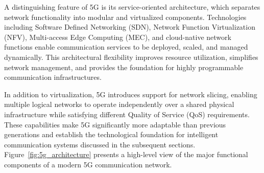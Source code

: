 \documentclass[12pt,a4paper]{report}
\begin{document}
	A distinguishing feature of 5G is its service-oriented architecture, which separates network functionality into modular and virtualized components. Technologies including Software Defined Networking (SDN), Network Function Virtualization (NFV), Multi-access Edge Computing (MEC), and cloud-native network functions enable communication services to be deployed, scaled, and managed dynamically. This architectural flexibility improves resource utilization, simplifies network management, and provides the foundation for highly programmable communication infrastructures.
	
	In addition to virtualization, 5G introduces support for network slicing, enabling multiple logical networks to operate independently over a shared physical infrastructure while satisfying different Quality of Service (QoS) requirements. These capabilities make 5G significantly more adaptable than previous generations and establish the technological foundation for intelligent communication systems discussed in the subsequent sections. Figure~\ref{fig:5g_architecture} presents a high-level view of the major functional components of a modern 5G communication network.
	
\end{document}

